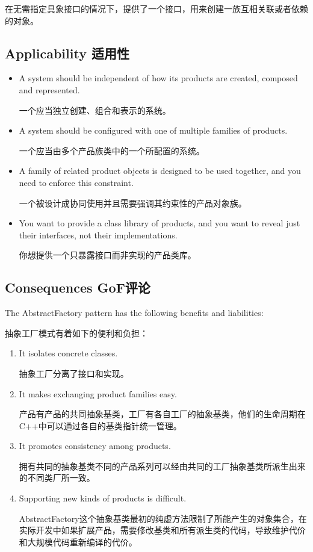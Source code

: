 在无需指定具象接口的情况下，提供了一个接口，用来创建一族互相关联或者依赖的对象。

\subsection{Applicability 适用性}

\begin{itemize}
\item A system should be independent of how its products are created, composed and represented.

      一个应当独立创建、组合和表示的系统。

\item A system should be configured with one of multiple families of products.

      一个应当由多个产品族类中的一个所配置的系统。

\item A family of related product objects is designed to be used together, and you need to enforce this constraint.

      一个被设计成协同使用并且需要强调其约束性的产品对象族。

\item You want to provide a class library of products, and you want to reveal just their interfaces, not their implementations.

      你想提供一个只暴露接口而非实现的产品类库。
\end{itemize}

\subsection{Consequences GoF评论}

The AbstractFactory pattern has the following benefits and liabilities:

抽象工厂模式有着如下的便利和负担：

\begin{enumerate}

\item It isolates concrete classes.

      抽象工厂分离了接口和实现。

\item It makes exchanging product families easy.
    
      产品有产品的共同抽象基类，工厂有各自工厂的抽象基类，他们的生命周期在C++中可以通过各自的基类指针统一管理。


\item It promotes consistency among products.

      拥有共同的抽象基类不同的产品系列可以经由共同的工厂抽象基类所派生出来的不同类厂所一致。

\item Supporting new kinds of products is difficult.

      AbstractFactory这个抽象基类最初的纯虚方法限制了所能产生的对象集合，在实际开发中如果扩展产品，需要修改基类和所有派生类的代码，导致维护代价和大规模代码重新编译的代价。
\end{enumerate}

